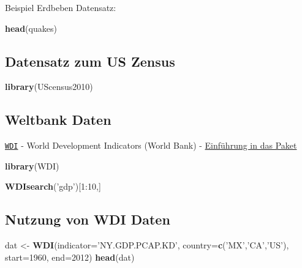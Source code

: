 \documentclass[]{article}
\newenvironment{Shaded}{\begin{snugshade}}{\end{snugshade}}
\newcommand{\KeywordTok}[1]{\textcolor[rgb]{0.13,0.29,0.53}{\textbf{{#1}}}}
\newcommand{\DataTypeTok}[1]{\textcolor[rgb]{0.13,0.29,0.53}{{#1}}}
\newcommand{\DecValTok}[1]{\textcolor[rgb]{0.00,0.00,0.81}{{#1}}}
\newcommand{\StringTok}[1]{\textcolor[rgb]{0.31,0.60,0.02}{{#1}}}
\newcommand{\NormalTok}[1]{{#1}}
\begin{document}
Beispiel Erdbeben Datensatz:

\begin{Shaded}
\begin{Highlighting}[]
\KeywordTok{head}\NormalTok{(quakes)}
\end{Highlighting}
\end{Shaded}

\subsection{Datensatz zum US Zensus}\label{datensatz-zum-us-zensus}

\begin{Shaded}
\begin{Highlighting}[]
\KeywordTok{library}\NormalTok{(UScensus2010)}
\end{Highlighting}
\end{Shaded}

\subsection{Weltbank Daten}\label{weltbank-daten}

\href{https://cran.r-project.org/web/packages/WDI/index.html}{\texttt{WDI}}
- World Development Indicators (World Bank) -
\href{https://github.com/vincentarelbundock/WDI}{Einführung in das
Paket}

\begin{Shaded}
\begin{Highlighting}[]
\KeywordTok{library}\NormalTok{(WDI)}
\end{Highlighting}
\end{Shaded}

\begin{Shaded}
\begin{Highlighting}[]
\KeywordTok{WDIsearch}\NormalTok{(}\StringTok{'gdp'}\NormalTok{)[}\DecValTok{1}\NormalTok{:}\DecValTok{10}\NormalTok{,]}
\end{Highlighting}
\end{Shaded}

\subsection{Nutzung von WDI Daten}\label{nutzung-von-wdi-daten}

\begin{Shaded}
\begin{Highlighting}[]
\NormalTok{dat <-}\StringTok{  }\KeywordTok{WDI}\NormalTok{(}\DataTypeTok{indicator=}\StringTok{'NY.GDP.PCAP.KD'}\NormalTok{, }\DataTypeTok{country=}\KeywordTok{c}\NormalTok{(}\StringTok{'MX'}\NormalTok{,}\StringTok{'CA'}\NormalTok{,}\StringTok{'US'}\NormalTok{), }\DataTypeTok{start=}\DecValTok{1960}\NormalTok{, }\DataTypeTok{end=}\DecValTok{2012}\NormalTok{)}
\KeywordTok{head}\NormalTok{(dat)}
\end{Highlighting}
\end{Shaded}
\end{document}
